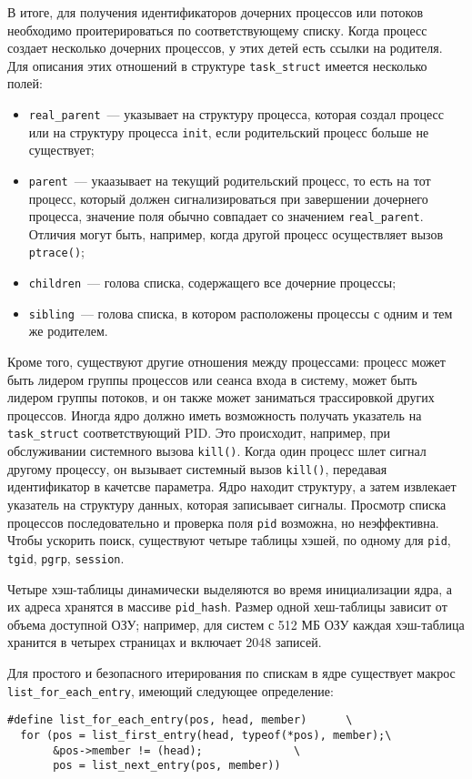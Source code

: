 В итоге, для получения идентификаторов дочерних процессов или потоков необходимо
проитерироваться по соответствующему списку. Когда процесс создает несколько
дочерних процессов, у этих детей есть ссылки на родителя. Для описания этих
отношений в структуре \texttt{task\_struct} имеется несколько полей:
\begin{itemize}
\item \texttt{real\_parent}~--- указывает на структуру процесса, которая создал
  процесс или на структуру процесса \texttt{init}, если родительский процесс
  больше не существует;
\item \texttt{parent}~--- укаазывает на текущий родительский процесс, то есть на
  тот процесс, который должен сигнализироваться при завершении дочернего
  процесса, значение поля обычно совпадает со значением \texttt{real\_parent}.
  Отличия могут быть, например, когда другой процесс осуществляет вызов
  \texttt{ptrace()};
\item \texttt{children}~--- голова списка, содержащего все дочерние процессы;
\item \texttt{sibling}~--- голова списка, в котором расположены процессы с одним
  и тем же родителем.
\end{itemize}

Кроме того, существуют другие отношения между процессами: процесс может быть
лидером группы процессов или сеанса входа в систему, может быть лидером группы
потоков, и он также может заниматься трассировкой других процессов. Иногда ядро
должно иметь возможность получать указатель на \texttt{task\_struct}
соответствующий PID. Это происходит, например, при обслуживании системного
вызова \texttt{kill()}. Когда один процесс шлет сигнал другому процессу, он
вызывает системный вызов \texttt{kill()}, передавая идентификатор в качетсве
параметра. Ядро находит структуру, а затем извлекает указатель на структуру
данных, которая записывает сигналы. Просмотр списка процессов последовательно и
проверка поля \texttt{pid} возможна, но неэффективна. Чтобы ускорить поиск,
существуют четыре таблицы хэшей, по одному для \texttt{pid}, \texttt{tgid},
\texttt{pgrp}, \texttt{session}.

Четыре хэш-таблицы динамически выделяются во время инициализации ядра, а их
адреса хранятся в массиве \texttt{pid\_hash}. Размер одной хеш-таблицы зависит
от объема доступной ОЗУ; например, для систем с 512 МБ ОЗУ каждая хэш-таблица
хранится в четырех страницах и включает 2048 записей.

Для простого и безопасного итерирования по спискам в ядре существует макрос
\texttt{list\_for\_each\_entry}, имеющий следующее определение:
\medskip
\begin{lstlisting}[style=cstyle]
#define list_for_each_entry(pos, head, member)		\
  for (pos = list_first_entry(head, typeof(*pos), member);\
       &pos->member != (head);				\
       pos = list_next_entry(pos, member))
\end{lstlisting}
\medskip

